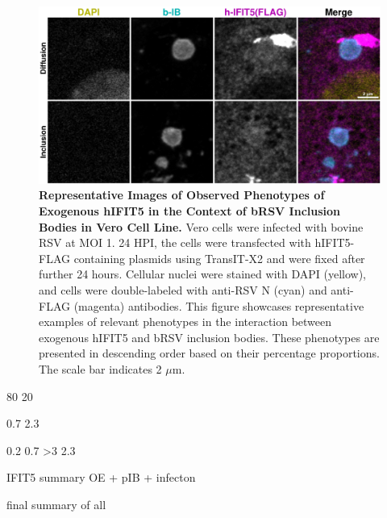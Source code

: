 \begin{figure}
    \centering
    \includegraphics[width=1\linewidth]{09. Chapter 4/Figs/02. Overexpression/04. IFIT5/06. i5-brsv.pdf}
    \caption[Representative Images of Observed Phenotypes of Exogenous hIFIT5 in the Context of bRSV Inclusion Bodies in Vero Cell Line.]{\textbf{Representative Images of Observed Phenotypes of Exogenous hIFIT5 in the Context of bRSV Inclusion Bodies in Vero Cell Line.} Vero cells were infected with bovine RSV at MOI 1. 24 HPI, the cells were transfected with hIFIT5-FLAG containing plasmids using TransIT-X2 and were fixed after further 24 hours. Cellular nuclei were stained with DAPI (yellow), and cells were double-labeled with anti-RSV N (cyan) and anti-FLAG (magenta) antibodies. This figure showcases representative examples of relevant phenotypes in the interaction between exogenous hIFIT5 and bRSV inclusion bodies. These phenotypes are presented in descending order based on their percentage proportions. The scale bar indicates 2 \(\mu \mbox{m}\).}
    \label{fig:Representative Images of Observed Phenotypes of Exogenous hIFIT5 in the Context of bRSV Inclusion Bodies in VERO Cell Line}
\end{figure}

80 20

0.7 2.3

0.2 0.7 >3
2.3


IFIT5 summary OE + pIB + infecton

final summary of all